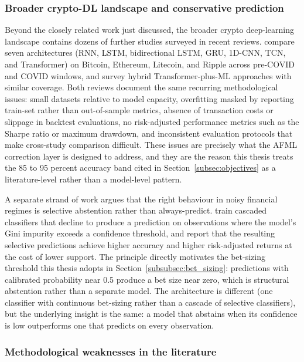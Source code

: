 \documentclass[12pt,a4paper,oneside]{article}
\begin{document}
\subsubsection{Broader crypto-DL landscape and conservative prediction}\label{subsubsec:btc_dl_landscape}

Beyond the closely related work just discussed, the broader crypto deep-learning landscape contains dozens of further studies surveyed in recent reviews. \citet{wu_crypto_dl_review_2024} compare seven architectures (RNN, LSTM, bidirectional LSTM, GRU, 1D-CNN, TCN, and Transformer) on Bitcoin, Ethereum, Litecoin, and Ripple across pre-COVID and COVID windows, and \citet{bourday_crypto_dl_2024} survey hybrid Transformer-plus-ML approaches with similar coverage. Both reviews document the same recurring methodological issues: small datasets relative to model capacity, overfitting masked by reporting train-set rather than out-of-sample metrics, absence of transaction costs or slippage in backtest evaluations, no risk-adjusted performance metrics such as the Sharpe ratio or maximum drawdown, and inconsistent evaluation protocols that make cross-study comparison difficult. These issues are precisely what the AFML correction layer is designed to address, and they are the reason this thesis treats the 85 to 95 percent accuracy band cited in Section~\ref{subsec:objectives} as a literature-level rather than a model-level pattern.

A separate strand of work argues that the right behaviour in noisy financial regimes is selective abstention rather than always-predict. \citet{nabar_shroff_2023} train cascaded classifiers that decline to produce a prediction on observations where the model's Gini impurity exceeds a confidence threshold, and report that the resulting selective predictions achieve higher accuracy and higher risk-adjusted returns at the cost of lower support. The principle directly motivates the bet-sizing threshold this thesis adopts in Section~\ref{subsubsec:bet_sizing}: predictions with calibrated probability near 0.5 produce a bet size near zero, which is structural abstention rather than a separate model. The architecture is different (one classifier with continuous bet-sizing rather than a cascade of selective classifiers), but the underlying insight is the same: a model that abstains when its confidence is low outperforms one that predicts on every observation.


\subsubsection{Methodological weaknesses in the literature}\label{subsubsec:btc_weaknesses}
\end{document}
